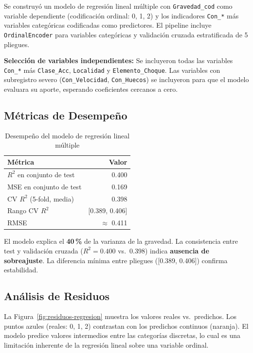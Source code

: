 \documentclass[11pt,a4paper]{article}
\begin{document}
Se construyó un modelo de regresión lineal múltiple con \texttt{Gravedad\_cod} como
variable dependiente (codificación ordinal: 0, 1, 2) y los indicadores \texttt{Con\_*} más
variables categóricas codificadas como predictores. El pipeline incluye
\texttt{OrdinalEncoder} para variables categóricas y validación cruzada estratificada de
5 pliegues.

\textbf{Selección de variables independientes:} Se incluyeron todas las variables
\texttt{Con\_*} más \texttt{Clase\_Acc}, \texttt{Localidad} y \texttt{Elemento\_Choque}.
Las variables con subregistro severo (\texttt{Con\_Velocidad}, \texttt{Con\_Huecos}) se
incluyeron para que el modelo evaluara su aporte, esperando coeficientes cercanos a cero.

\subsection{Métricas de Desempeño}

\begin{table}[H]
\centering
\caption{Desempeño del modelo de regresión lineal múltiple}
\label{tab:regresion}
\begin{tabular}{@{}lr@{}}
\toprule
Métrica & Valor \\
\midrule
$R^2$ en conjunto de test & 0.400 \\
MSE en conjunto de test & 0.169 \\
CV $R^2$ (5-fold, media) & 0.398 \\
Rango CV $R^2$ & [0.389, 0.406] \\
RMSE & $\approx$ 0.411 \\
\bottomrule
\end{tabular}
\end{table}

El modelo explica el \textbf{40\,\%} de la varianza de la gravedad. La consistencia entre
test y validación cruzada ($R^2 = 0.400$ vs.\ $0.398$) indica \textbf{ausencia de
sobreajuste}. La diferencia mínima entre pliegues ([0.389, 0.406]) confirma estabilidad.

\subsection{Análisis de Residuos}

La Figura~\ref{fig:residuos-regresion} muestra los valores reales vs.\ predichos. Los
puntos azules (reales: 0, 1, 2) contrastan con los predichos continuos (naranja). El
modelo predice valores intermedios entre las categorías discretas, lo cual es una
limitación inherente de la regresión lineal sobre una variable ordinal.
\end{document}
